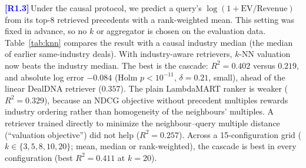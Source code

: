 \documentclass[conference]{IEEEtran}
\newcommand{\rc}[1]{\textcolor{blue}{\textbf{[#1]}}\,}
\newcommand{\rc}[1]{}
\begin{document}
\rc{R1.3}Under the causal protocol, we predict a query's $\log(1+\text{EV/Revenue})$ from its top-8 retrieved precedents with a rank-weighted mean. This setting was fixed in advance, so no $k$ or aggregator is chosen on the evaluation data. Table~\ref{tab:knn} compares the result with a causal industry median (the median of earlier same-industry deals). With industry-aware retrievers, $k$-NN valuation now beats the industry median. The best is the cascade: $R^2=0.402$ versus $0.219$, and absolute log error $-0.084$ (Holm $p<10^{-11}$, $\delta=0.21$, small), ahead of the linear DealDNA retriever ($0.357$). The plain LambdaMART ranker is weaker ($R^2=0.329$), because an NDCG objective without precedent multiples rewards industry ordering rather than homogeneity of the neighbours' multiples. A retriever trained directly to minimize the neighbour--query multiple distance (``valuation objective'') did not help ($R^2=0.257$). Across a 15-configuration grid ($k\in\{3,5,8,10,20\}$; mean, median or rank-weighted), the cascade is best in every configuration (best $R^2=0.411$ at $k=20$).

\begin{table}[t]
\centering
\caption{$k$-NN valuation (top-8, rank-weighted, causal; 1{,}088 queries) vs.\ the causal industry median. $\Delta$err: reduction in mean absolute log error vs.\ the industry median (positive favours the retriever).}
\label{tab:knn}
\footnotesize
\setlength{\tabcolsep}{3pt}
\end{table}
\end{document}
